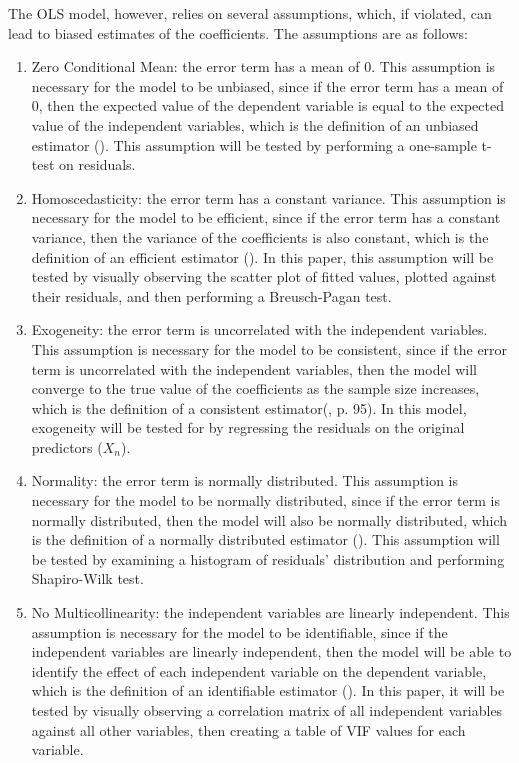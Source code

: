 \documentclass[12pt]{report}
\begin{document}
The OLS model, however, relies on several assumptions, which, if violated, can lead to biased estimates of the coefficients. The assumptions are as follows:
\begin{enumerate}
	\item Zero Conditional Mean: the error term has a mean of 0. This assumption is necessary for the model to be unbiased, since if the error term has a mean of 0, then the expected value of the dependent variable is equal to the expected value of the independent variables, which is the definition of an unbiased estimator (\cite{Crudu2022}). This assumption will be tested by performing a one-sample t-test on residuals.
	\item Homoscedasticity: the error term has a constant variance. This assumption is necessary for the model to be efficient, since if the error term has a constant variance, then the variance of the coefficients is also constant, which is the definition of an efficient estimator (\cite{Yang2019}). In this paper, this assumption will be tested by visually observing the scatter plot of fitted values, plotted against their residuals, and then performing a Breusch-Pagan test.
	\item Exogeneity: the error term is uncorrelated with the independent variables. This assumption is necessary for the model to be consistent, since if the error term is uncorrelated with the independent variables, then the model will converge to the true value of the coefficients as the sample size increases, which is the definition of a consistent estimator(\cite{Baltagi2011}, p. 95). In this model, exogeneity will be tested for by regressing the residuals on the original predictors ($X_n$).
	\item Normality: the error term is normally distributed. This assumption is necessary for the model to be normally distributed, since if the error term is normally distributed, then the model will also be normally distributed, which is the definition of a normally distributed estimator (\cite{schmidt2018}). This assumption will be tested by examining a histogram of residuals' distribution and performing Shapiro-Wilk test.
	\item No Multicollinearity: the independent variables are linearly independent. This assumption is necessary for the model to be identifiable, since if the independent variables are linearly independent, then the model will be able to identify the effect of each independent variable on the dependent variable, which is the definition of an identifiable estimator (\cite{shrestha2020}). In this paper, it will be tested by visually observing a correlation matrix of all independent variables against all other variables, then creating a table of VIF values for each variable.
\end{enumerate}
\end{document}
